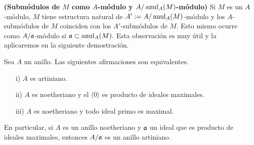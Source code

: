 \documentclass[../main.tex]{subfiles}
\begin{document}
\begin{remark}\textnormal{\textbf{(Submódulos de $M$ como $A$-módulo y $A/\operatorname{anul}_A(M)$-módulo)}}\label{A/a-modulos}
Si $M$ es un $A$-módulo, $M$ tiene estructura natural de $A':=A/\operatorname{anul}_A(M)$-módulo y los $A$-submódulos de $M$ coinciden con los $A'$-submódulos de $M.$ Esto mismo ocurre como $A/\mathfrak{a}$-módulo si $\mathfrak{a}\subset\operatorname{anul}_A(M).$ Esta observación es muy útil y la aplicaremos en la siguiente demostración.
\end{remark}

\begin{proposition}
Sea $A$ un anillo. Las siguientes afirmaciones son equivalentes.
\begin{itemize}
    \item[i)] $A$ es artiniano.
    \item[ii)] $A$ es noetheriano y el $\langle 0\rangle$ es producto de ideales maximales.
    \item[iii)] $A$ es noetheriano y todo ideal primo es maximal.
\end{itemize}
En particular, si $A$ es un anillo noetheriano y $\mathfrak{a}$ un ideal que es producto de ideales maximales, entonces $A/\mathfrak{a}$ es un anillo artiniano.
\end{proposition}
\end{document}
